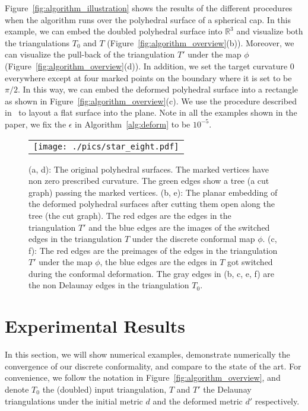 \documentclass[11pt]{article}
\begin{document}
Figure~\ref{fig:algorithm_illustration} shows the results of the different procedures 
when the algorithm runs over the polyhedral surface of a spherical cap.  
In this example, we can embed the doubled polyhedral surface into $\mathbb{R}^3$
and visualize both the triangulations $T_0$ and $T$ (Figure~\ref{fig:algorithm_overview}(b)). 
Moreover, we can visualize the 
pull-back of the triangulation $T'$ under the map $\phi$ (Figure~\ref{fig:algorithm_overview}(d)). 
In addition, we set the target curvature $0$ everywhere except at four marked points on the boundary 
where it is set to be $\pi/2$. In this way, we can embed the deformed polyhedral surface 
into a rectangle as shown in Figure~\ref{fig:algorithm_overview}(c). We use the procedure described 
in~\cite{gu:2008} to layout a flat surface into the plane. 
Note in all the examples shown in the paper, we fix the $\epsilon$ in Algorithm~\ref{alg:deform} to be $10^{-5}$. 

\begin{figure}[!ht]
\begin{center}
\begin{tabular}{c}
\texttt{[image: ./pics/star\_eight.pdf]}
\end{tabular}
\end{center}
\vspace{0.1in}
\caption{(a, d): The original polyhedral surfaces. The marked vertices
have non zero prescribed curvature. The green edges show a tree (a cut graph)
passing the marked vertices.
(b, e): The planar embedding of the deformed polyhedral surfaces after cutting
them open along the tree (the cut graph). 
The red edges are the edges in the triangulation $T'$ and the blue edges are the images of
the switched edges in the triangulation $T$ under the discrete conformal map $\phi$. 
(c, f): The red edges are the preimages of the edges in the triangulation $T'$ under the map $\phi$, 
the blue edges are the edges in $T$ got switched during the conformal deformation.
The gray edges in (b, c, e, f) are the non Delaunay edges in the 
triangulation $T_0$.
\label{fig:simple_examples}}
\end{figure}

\section{Experimental Results}
In this section, we will show numerical examples, demonstrate numerically 
the convergence of our discrete conformality, and compare to the state of the art. 
For convenience, we follow the notation in Figure~\ref{fig:algorithm_overview}, and 
denote $T_0$ the (doubled) input triangulation, $T$ and $T'$ the Delaunay triangulations
under the initial metric $d$ and the deformed metric $d'$ respectively. 
\end{document}
